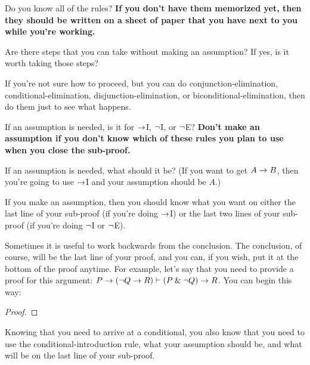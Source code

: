 \begin{earg}
\item[\ex{18-1}] Do you know all of the rules? \textbf{If you don’t have them memorized yet, then they should be written on a sheet of paper that you have next to you while you’re working.}
\medskip

\item[\ex{18-2}] Are there steps that you can take without making an assumption? If yes, is it worth taking those steps?
\medskip

\item[\ex{18-3}] If you’re not sure how to proceed, but you can do conjunction-elimination, conditional-elimination, disjunction-elimination, or biconditional-elimination, then do them just to see what happens.
\medskip

\item[\ex{18-4}] If an assumption is needed, is it for $\rightarrow$I, ${\neg}$I, or ${\neg}$E? \textbf{Don't make an assumption if you don't know which of these rules you plan to use when you close the sub-proof.}
\medskip

\item[\ex{18-5}] If an assumption is needed, what should it be? (If you want to get $A \rightarrow B$, then you’re going to use $\rightarrow$I and your assumption should be $A$.)
\medskip

\item[\ex{18-6}] If you make an assumption, then you should know what you want on either the last line of your sub-proof (if you’re doing $\rightarrow$I) or the last two lines of your sub-proof (if you’re doing ${\neg}$I or ${\neg}$E).
\medskip

\item[\ex{18-3a}] Sometimes it is useful to work backwards from the conclusion. The conclusion, of course, will be the last line of your proof, and you can, if you wish, put it at the bottom of the proof anytime. For example, let's say that you need to provide a proof for this argument: $P \rightarrow ({\neg} Q \rightarrow R) \vdash (P \mathbin{\&} {\neg} Q) \rightarrow R$. You can begin this way:
\begin{proof}
	 \pr{}
\end{proof}
\medskip

Knowing that you need to arrive at a conditional, you also know that you need to use the conditional-introduction rule, what your assumption should be, and what will be on the last line of your sub-proof.


\end{earg}
